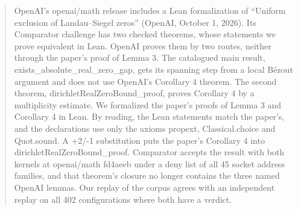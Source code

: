 \begin{abstract}
OpenAI's openai/math release includes a Lean formalization of ``Uniform exclusion of Landau--Siegel zeros'' (OpenAI, October 1, 2026).
Its Comparator challenge has two checked theorems, whose statements we prove equivalent in Lean.
OpenAI proves them by two routes, neither through the paper's proof of Lemma 3.
The catalogued main result, exists\_absolute\_real\_zero\_gap, gets its spanning step from a local B\'ezout argument and does not use OpenAI's Corollary 4 theorem.
The second theorem, dirichletRealZeroBound\_proof, proves Corollary 4 by a multiplicity estimate.
We formalized the paper's proofs of Lemma 3 and Corollary 4 in Lean.
By reading, the Lean statements match the paper's, and the declarations use only the axioms propext, Classical.choice and Quot.sound.
A +2/-1 substitution puts the paper's Corollary 4 into dirichletRealZeroBound\_proof.
Comparator accepts the result with both kernels at openai/math fd4aeeb under a deny list of all 45 socket address families, and that theorem's closure no longer contains the three named OpenAI lemmas.
Our replay of the corpus agrees with an independent replay on all 402 configurations where both have a verdict.
\end{abstract}
